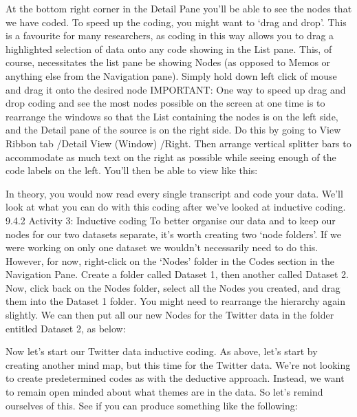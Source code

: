 \documentclass[
]{book}
\begin{document}
At the bottom right corner in the Detail Pane you'll be able to see the nodes that we have coded.
To speed up the coding, you might want to `drag and drop'. This is a favourite for many researchers, as coding in this way allows you to drag a highlighted selection of data onto any code showing in the List pane. This, of course, necessitates the list pane be showing Nodes (as opposed to Memos or anything else from the Navigation pane). Simply hold down left click of mouse and drag it onto the desired node
IMPORTANT: One way to speed up drag and drop coding and see the most nodes possible on the screen at one time is to rearrange the windows so that the List containing the nodes is on the left side, and the Detail pane of the source is on the right side. Do this by going to View Ribbon tab /Detail View (Window) /Right. Then arrange vertical splitter bars to accommodate as much text on the right as possible while seeing enough of the code labels on the left. You'll then be able to view like this:

In theory, you would now read every single transcript and code your data. We'll look at what you can do with this coding after we've looked at inductive coding.
9.4.2 Activity 3: Inductive coding
To better organise our data and to keep our nodes for our two datasets separate, it's worth creating two `node folders'. If we were working on only one dataset we wouldn't necessarily need to do this. However, for now, right-click on the `Nodes' folder in the Codes section in the Navigation Pane. Create a folder called Dataset 1, then another called Dataset 2. Now, click back on the Nodes folder, select all the Nodes you created, and drag them into the Dataset 1 folder. You might need to rearrange the hierarchy again slightly. We can then put all our new Nodes for the Twitter data in the folder entitled Dataset 2, as below:

Now let's start our Twitter data inductive coding. As above, let's start by creating another mind map, but this time for the Twitter data. We're not looking to create predetermined codes as with the deductive approach. Instead, we want to remain open minded about what themes are in the data. So let's remind ourselves of this. See if you can produce something like the following:
\end{document}

